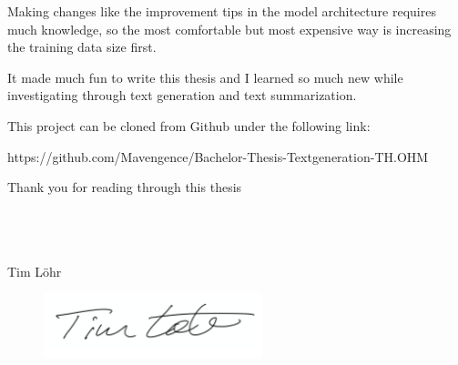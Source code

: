 Making changes like the improvement tips in the model architecture requires much knowledge, so the most comfortable but most expensive way is increasing the training data size first. 






It made much fun to write this thesis and I learned so much new while investigating through text generation and text summarization.

This project can be cloned from Github under the following link:

\begin{tcolorbox}
	https://github.com/Mavengence/Bachelor-Thesis-Textgeneration-TH.OHM
\end{tcolorbox}

Thank you for reading through this thesis \\ \\ \\ \\

\begin{center}
	\large Tim Löhr
\end{center}


\begin{figure}[H]
	\centering
	\includegraphics[width=2.5in]{photos/sign}
\end{figure}